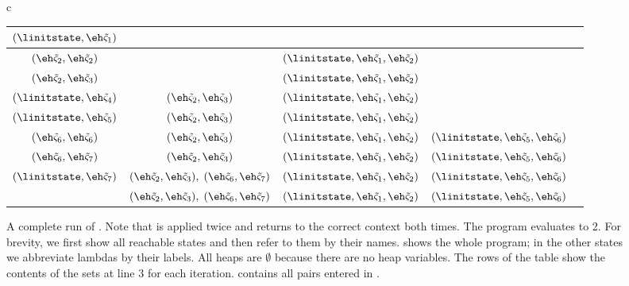 \documentclass{LMCS}
\theoremstyle{definition} \newtheorem{property}[thm]{Property}
\begin{document}
\begin{figure}[!t]
{\begin{tabular*}{\textwidth}{c}
\begin{tabular}{|@{$\quad$} c @{$\quad$} | @{$\quad$} c @{$\quad$} | @{$\quad$} c @{$\quad$} | @{$\quad$} c @{$\quad$} | @{$\qquad$} c @{$\qquad$}|}
    \hline
    $(\linitstate, \statnum{1})$ &
    \mtset & \mtset & \mtset & \mtset \rule{0cm}{0.45cm} 
    \\
    \hline
    $(\statnum{2}, \statnum{2})$ & \mtset & 
    $(\linitstate, \statnum{1}, \statnum{2})$ & 
    \mtset & \mtset \rule{0cm}{0.45cm} 
    \\
    \hline
    $(\statnum{2}, \statnum{3})$ & \mtset & 
    $(\linitstate, \statnum{1}, \statnum{2})$ &
    \mtset & \mtset \rule{0cm}{0.45cm} 
    \\
    \hline
    $(\linitstate, \statnum{4})$ &
    $(\statnum{2}, \statnum{3})$ & 
    $(\linitstate, \statnum{1}, \statnum{2})$ &
    \mtset & \mtset \rule{0cm}{0.45cm} 
    \\
    \hline
    $(\linitstate, \statnum{5})$ &
    $(\statnum{2}, \statnum{3})$ & 
    $(\linitstate, \statnum{1}, \statnum{2})$ &
    \mtset & \mtset \rule{0cm}{0.45cm} 
    \\
    \hline
    $(\statnum{6}, \statnum{6})$ &
    $(\statnum{2}, \statnum{3})$ & 
    $(\linitstate, \statnum{1}, \statnum{2})$ &
    $(\linitstate, \statnum{5}, \statnum{6})$ &
    \mtset \rule{0cm}{0.45cm} 
    \\
    \hline
    $(\statnum{6}, \statnum{7})$ &
    $(\statnum{2}, \statnum{3})$ & 
    $(\linitstate, \statnum{1}, \statnum{2})$ &
    $(\linitstate, \statnum{5}, \statnum{6})$ &
    \mtset \rule{0cm}{0.45cm} 
    \\
    \hline
    $(\linitstate, \statnum{7})$ &
    $(\statnum{2}, \statnum{3}), \; (\statnum{6}, \statnum{7})$ & 
    $(\linitstate, \statnum{1}, \statnum{2})$ &
    $(\linitstate, \statnum{5}, \statnum{6})$ &
    \mtset \rule{0cm}{0.45cm} 
    \\
    \hline
    \mtset &
    $(\statnum{2}, \statnum{3}), \; (\statnum{6}, \statnum{7})$ & 
    $(\linitstate, \statnum{1}, \statnum{2})$ &
    $(\linitstate, \statnum{5}, \statnum{6})$ &
    \statnum{8} \rule{0cm}{0.45cm} 
    \\
    \hline
  \end{tabular}
\end{tabular*}
}
\caption{A complete run of \cfat{}. 
  Note that  is applied twice and returns to the correct context both 
  times. 
  The program evaluates to 2.
  For brevity, we first show all reachable states and then refer to them by 
  their names.
  \linitstate{} shows the whole program; in the other states we abbreviate
  lambdas by their labels.
  All heaps are $\emptyset$ because there are no heap variables.
  The rows of the table show the contents of the sets at line 3 for each
  iteration.
  \seen{} contains all pairs entered in \work{}.
  \label{fig:cfa2-eg}}
\end{figure}
\end{document}
